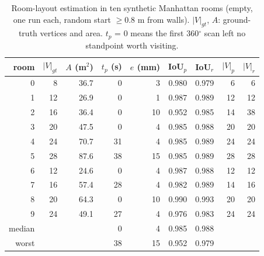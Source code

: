 \begin{table}[t]
\centering
\caption{Room-layout estimation in ten synthetic Manhattan rooms (empty, one run each, random start $\geq$0.8 m from walls). $|V|_{gt}$, $A$: ground-truth vertices and area. $t_p$ = 0 means the first 360$^\circ$ scan left no standpoint worth visiting.}
\label{tab:estimation-synthetic}
\begin{tabular}{r r r r r r r r r}
\toprule
room & $|V|_{gt}$ & $A$ (m$^2$) & $t_p$ (s) & $e$ (mm) & IoU$_p$ & IoU$_r$ & $|V|_p$ & $|V|_r$ \\
\midrule
0 & 8 & 36.7 & 0 & 3 & 0.980 & 0.979 & 6 & 6 \\
1 & 12 & 26.9 & 0 & 1 & 0.987 & 0.989 & 12 & 12 \\
2 & 16 & 36.4 & 0 & 10 & 0.952 & 0.985 & 14 & 38 \\
3 & 20 & 47.5 & 0 & 4 & 0.985 & 0.988 & 20 & 20 \\
4 & 24 & 70.7 & 31 & 4 & 0.985 & 0.989 & 24 & 24 \\
5 & 28 & 87.6 & 38 & 15 & 0.985 & 0.989 & 28 & 28 \\
6 & 12 & 24.6 & 0 & 4 & 0.987 & 0.988 & 12 & 12 \\
7 & 16 & 57.4 & 28 & 4 & 0.982 & 0.989 & 14 & 16 \\
8 & 20 & 64.3 & 0 & 10 & 0.990 & 0.993 & 20 & 20 \\
9 & 24 & 49.1 & 27 & 4 & 0.976 & 0.983 & 24 & 24 \\
\midrule
median & & & 0 & 4 & 0.985 & 0.988 & & \\
worst & & & 38 & 15 & 0.952 & 0.979 & & \\
\bottomrule
\end{tabular}
\end{table}
